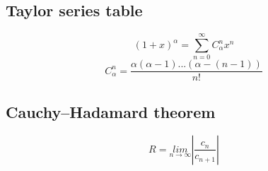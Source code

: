 \documentclass{article}
\begin{document}
\hypertarget{8.2}{}
\subsection{Taylor series table}
\begin{equation*}
    (1+x)^\alpha = \sum_{n=0}^{\infty} C_{\alpha}^n x^n
\end{equation*}
\begin{equation*}
    C_{\alpha}^n = \frac{\alpha(\alpha - 1)...(\alpha - (n - 1))}{n!}
\end{equation*}

\hypertarget{8.3}{}
\subsection{Cauchy–Hadamard theorem}
\begin{equation*}
    R = \underset{n \rightarrow \infty}{lim} |\frac{c_n}{c_{n+1}}|
\end{equation*}
\end{document}
